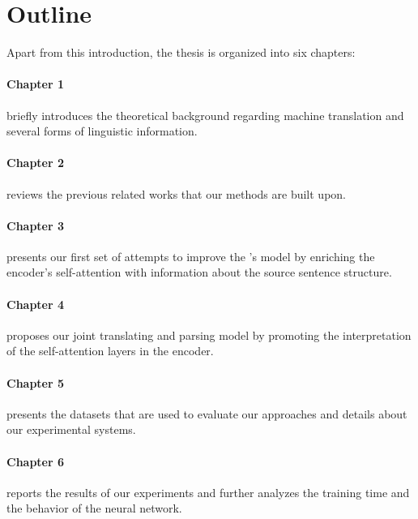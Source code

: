 \section*{Outline}

Apart from this introduction, the thesis is organized into six chapters:

\paragraph{Chapter 1} briefly introduces the theoretical background regarding machine translation and several forms of linguistic information.
\paragraph{Chapter 2} reviews the previous related works that our methods are built upon.
\paragraph{Chapter 3} presents our first set of attempts to improve the \transformer's model by enriching the encoder's self-attention with information about the source sentence structure.
\paragraph{Chapter 4} proposes our joint translating and parsing model by promoting the interpretation of the self-attention layers in the encoder.
\paragraph{Chapter 5} presents the datasets that are used to evaluate our approaches and details about our experimental systems.
\paragraph{Chapter 6} reports the results of our experiments and further analyzes the training time and the behavior of the neural network.
